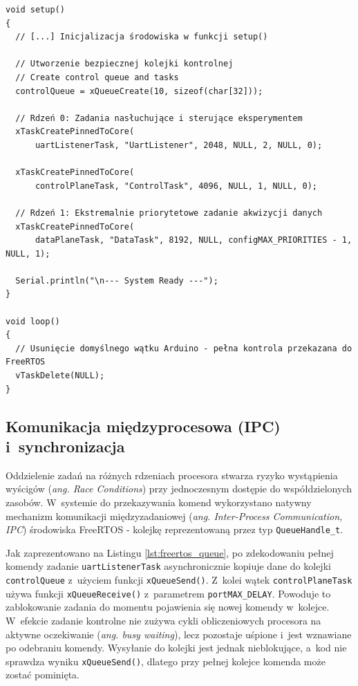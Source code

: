 \begin{listing}[htbp]
    \caption{Usunięcie zadania pętli głównej i~utworzenie zadań przypiętych do rdzeni procesora (\texttt{main.cpp}) \cite{espy_nexus_esp32_firmware}.}
    \label{lst:freertos_tasks}
    \begin{verbatim}
void setup()
{
  // [...] Inicjalizacja środowiska w funkcji setup()

  // Utworzenie bezpiecznej kolejki kontrolnej
  // Create control queue and tasks
  controlQueue = xQueueCreate(10, sizeof(char[32]));

  // Rdzeń 0: Zadania nasłuchujące i sterujące eksperymentem
  xTaskCreatePinnedToCore(
      uartListenerTask, "UartListener", 2048, NULL, 2, NULL, 0);

  xTaskCreatePinnedToCore(
      controlPlaneTask, "ControlTask", 4096, NULL, 1, NULL, 0);

  // Rdzeń 1: Ekstremalnie priorytetowe zadanie akwizycji danych
  xTaskCreatePinnedToCore(
      dataPlaneTask, "DataTask", 8192, NULL, configMAX_PRIORITIES - 1, NULL, 1);

  Serial.println("\n--- System Ready ---");
}

void loop()
{
  // Usunięcie domyślnego wątku Arduino - pełna kontrola przekazana do FreeRTOS
  vTaskDelete(NULL);
}
\end{verbatim}
\end{listing}

\subsection{Komunikacja międzyprocesowa (IPC) i~synchronizacja}
Oddzielenie zadań na różnych rdzeniach procesora stwarza ryzyko wystąpienia wyścigów (\textit{ang. Race Conditions}) przy jednoczesnym dostępie do współdzielonych zasobów.
W~systemie do przekazywania komend wykorzystano natywny mechanizm komunikacji międzyzadaniowej (\textit{ang. Inter-Process Communication, IPC}) środowiska FreeRTOS - kolejkę reprezentowaną przez typ \texttt{QueueHandle\_t}.

Jak zaprezentowano na Listingu \ref{lst:freertos_queue}, po zdekodowaniu pełnej komendy zadanie \texttt{uartListenerTask} asynchronicznie kopiuje dane do kolejki \texttt{controlQueue} z~użyciem funkcji \texttt{xQueueSend()}.
Z~kolei wątek \texttt{controlPlaneTask} używa funkcji \texttt{xQueueReceive()} z~parametrem \texttt{portMAX\_DELAY}.
Powoduje to zablokowanie zadania do momentu pojawienia się nowej komendy w~kolejce.
W~efekcie zadanie kontrolne nie zużywa cykli obliczeniowych procesora na aktywne oczekiwanie (\textit{ang. busy waiting}), lecz pozostaje uśpione i~jest wznawiane po odebraniu komendy. Wysyłanie do kolejki jest jednak nieblokujące, a~kod nie sprawdza wyniku \texttt{xQueueSend()}, dlatego przy pełnej kolejce komenda może zostać pominięta.

